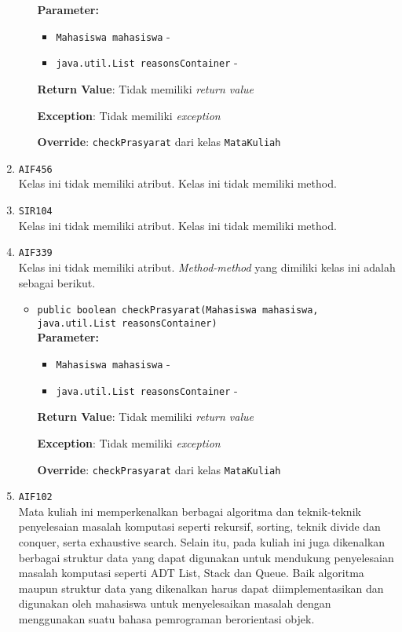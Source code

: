 \documentclass{article}
\begin{document}
\begin{enumerate}
\begin{itemize}
\textbf{Parameter:}\begin{itemize}
\item \texttt{Mahasiswa mahasiswa} - 
\item \texttt{java.util.List reasonsContainer} - 
\end{itemize}
\textbf{Return Value}: Tidak memiliki \textit{return value}

\textbf{Exception}: Tidak memiliki \textit{exception}

\textbf{Override}: \texttt{checkPrasyarat} dari kelas \texttt{MataKuliah}

\end{itemize}
\item \texttt{AIF456}\\ 


Kelas ini tidak memiliki atribut. Kelas ini tidak memiliki method. \item \texttt{SIR104}\\ 


Kelas ini tidak memiliki atribut. Kelas ini tidak memiliki method. \item \texttt{AIF339}\\ 


Kelas ini tidak memiliki atribut. \textit{Method-method} yang dimiliki kelas ini adalah sebagai berikut.
\begin{itemize}
\item \texttt{public boolean checkPrasyarat(Mahasiswa mahasiswa, java.util.List reasonsContainer)}\\ 


\textbf{Parameter:}\begin{itemize}
\item \texttt{Mahasiswa mahasiswa} - 
\item \texttt{java.util.List reasonsContainer} - 
\end{itemize}
\textbf{Return Value}: Tidak memiliki \textit{return value}

\textbf{Exception}: Tidak memiliki \textit{exception}

\textbf{Override}: \texttt{checkPrasyarat} dari kelas \texttt{MataKuliah}

\end{itemize}
\item \texttt{AIF102}\\ 
Mata kuliah ini memperkenalkan berbagai algoritma dan teknik-teknik 
 penyelesaian masalah komputasi seperti rekursif, sorting, teknik divide dan 
 conquer, serta exhaustive search. Selain itu, pada kuliah ini juga 
 dikenalkan berbagai struktur data yang dapat digunakan untuk mendukung 
 penyelesaian masalah komputasi seperti ADT List, Stack dan Queue. Baik 
 algoritma maupun struktur data yang dikenalkan harus dapat diimplementasikan 
 dan digunakan oleh mahasiswa untuk menyelesaikan masalah dengan menggunakan 
 suatu bahasa pemrograman berorientasi objek.


\end{enumerate}
\end{document}
